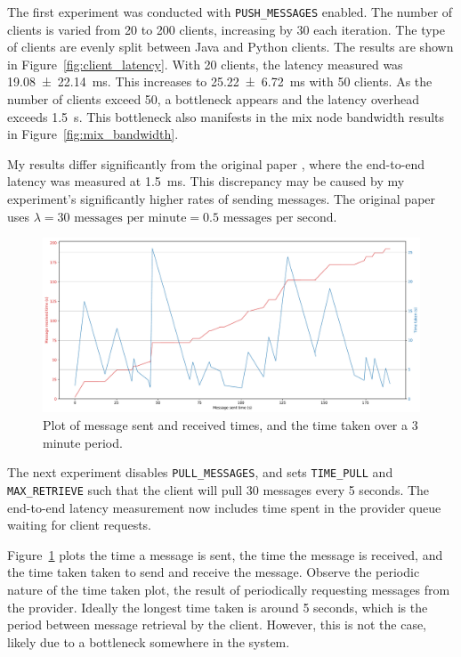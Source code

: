 \documentclass[final,dissertation.tex]{subfiles}
\begin{document}
The first experiment was conducted with \verb|PUSH_MESSAGES| enabled. The number of clients is varied from 20 to 200 clients, increasing by 30 each iteration. The type of clients are evenly split between Java and Python clients. The results are shown in Figure~\ref{fig:client_latency}. With 20 clients, the latency measured was \SI[separate-uncertainty=true]{19.08(2214)}{\milli\second}. This increases to \SI[separate-uncertainty=true]{25.22(672)}{\milli\second} with 50 clients. As the number of clients exceed 50, a bottleneck appears and the latency overhead exceeds \SI{1.5}{\second}. This bottleneck also manifests in the mix node bandwidth results in Figure~\ref{fig:mix_bandwidth}. 

My results differ significantly from the original paper \cite{piotrowska2017loopix}, where the end-to-end latency was measured at \SI{1.5}{\milli\second}. This discrepancy may be caused by my experiment's significantly higher rates of sending messages. The original paper uses $\lambda = 30\text{ messages per minute} = 0.5\text{ messages per second}$. 

\begin{figure}[h]
	\includegraphics[width=\linewidth]{../figs/client_total_latency}
	\caption{Plot of message sent and received times, and the time taken over a 3 minute period.}
	\label{fig:client_total_latency}
\end{figure}

The next experiment disables \verb|PULL_MESSAGES|, and sets \verb|TIME_PULL| and \verb|MAX_RETRIEVE| such that the client will pull 30 messages every 5 seconds. The end-to-end latency measurement now includes time spent in the provider queue waiting for client requests.

Figure~\ref{fig:client_total_latency} plots the time a message is sent, the time the message is received, and the time taken taken to send and receive the message. Observe the periodic nature of the time taken plot, the result of periodically requesting messages from the provider. Ideally the longest time taken is around 5 seconds, which is the period between message retrieval by the client. However, this is not the case, likely due to a bottleneck somewhere in the system.
\end{document}
